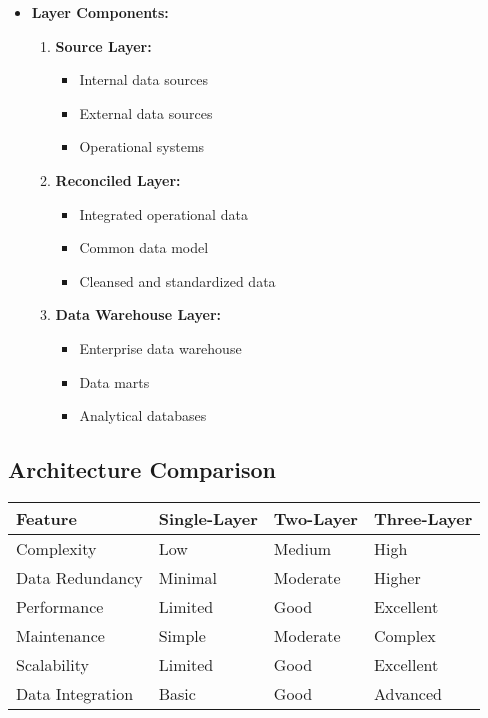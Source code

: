 \begin{itemize}
    \item \textbf{Layer Components:}
        \begin{enumerate}
            \item \textbf{Source Layer:}
                \begin{itemize}
                    \item Internal data sources
                    \item External data sources
                    \item Operational systems
                \end{itemize}
            \item \textbf{Reconciled Layer:}
                \begin{itemize}
                    \item Integrated operational data
                    \item Common data model
                    \item Cleansed and standardized data
                \end{itemize}
            \item \textbf{Data Warehouse Layer:}
                \begin{itemize}
                    \item Enterprise data warehouse
                    \item Data marts
                    \item Analytical databases
                \end{itemize}
        \end{enumerate}
\end{itemize}

\subsection{Architecture Comparison}
\begin{center}
\begin{tabular}{|p{3cm}|p{4cm}|p{4cm}|p{4cm}|}
    \hline
    \textbf{Feature} & \textbf{Single-Layer} & \textbf{Two-Layer} & \textbf{Three-Layer} \\
    \hline
    Complexity & Low & Medium & High \\
    \hline
    Data Redundancy & Minimal & Moderate & Higher \\
    \hline
    Performance & Limited & Good & Excellent \\
    \hline
    Maintenance & Simple & Moderate & Complex \\
    \hline
    Scalability & Limited & Good & Excellent \\
    \hline
    Data Integration & Basic & Good & Advanced \\
    \hline
\end{tabular}
\end{center}

